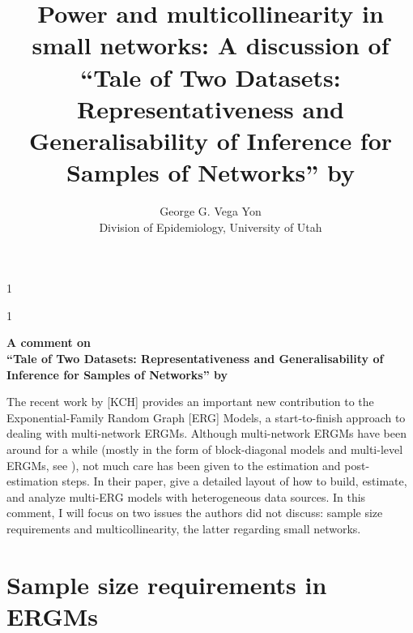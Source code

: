 \documentclass[12pt]{article}
\newcommand{\blind}{0}
\begin{document}
%

\def\spacingset#1{\renewcommand{\baselinestretch}%
{#1}\small\normalsize} \spacingset{1}



\def\blind{1}

\blind
{
  \title{\bf Power and multicollinearity in small networks: A discussion of\\``Tale of Two Datasets: Representativeness
  and Generalisability of Inference for Samples of Networks'' by \citeauthor*{krivitskyTaleTwoDatasets2022}}
  \author{George G. Vega Yon\hspace{.2cm}\\
    Division of Epidemiology, University of Utah
    }
  \maketitle
} \fi

\blind
{
  \bigskip
  \bigskip
  \bigskip
  \begin{center}
    {\LARGE\bf A comment on\\``Tale of Two Datasets: Representativeness
    and Generalisability of Inference for Samples of Networks'' by \citeauthor*{krivitskyTaleTwoDatasets2022}}
\end{center}
  \medskip
} \fi

\spacingset{1.9} %

The recent work by \citeauthor*{krivitskyTaleTwoDatasets2022} [KCH] provides an important new contribution to the Exponential-Family Random Graph [ERG] Models, a start-to-finish approach to dealing with multi-network ERGMs. Although multi-network ERGMs have been around for a while (mostly in the form of block-diagonal models and multi-level ERGMs, see \cite{duxburyScalingBiasPooled2023,wangExponentialRandomGraph2013, slaughterMultilevelModelsSocial2016}), not much care has been given to the estimation and post-estimation steps. In their paper, \citeauthor*{krivitskyTaleTwoDatasets2022} give a detailed layout of how to build, estimate, and analyze multi-ERG models with heterogeneous data sources. In this comment, I will focus on two issues the authors did not discuss: sample size requirements and multicollinearity, the latter regarding small networks. 


\section{Sample size requirements in ERGMs}
\end{document}
